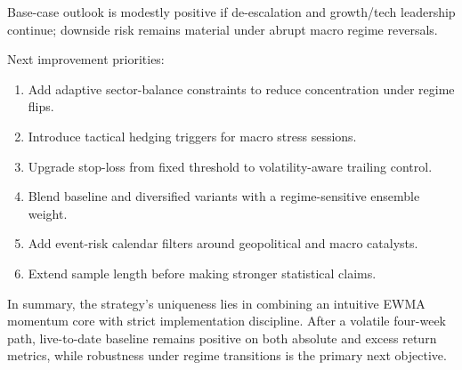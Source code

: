 \documentclass[11pt]{article}
\begin{document}
Base-case outlook is modestly positive if de-escalation and growth/tech leadership continue; downside risk remains material under abrupt macro regime reversals.

Next improvement priorities:
\begin{enumerate}
\item Add adaptive sector-balance constraints to reduce concentration under regime flips.
\item Introduce tactical hedging triggers for macro stress sessions.
\item Upgrade stop-loss from fixed threshold to volatility-aware trailing control.
\item Blend baseline and diversified variants with a regime-sensitive ensemble weight.
\item Add event-risk calendar filters around geopolitical and macro catalysts.
\item Extend sample length before making stronger statistical claims.
\end{enumerate}

In summary, the strategy's uniqueness lies in combining an intuitive EWMA momentum core with strict implementation discipline. After a volatile four-week path, live-to-date baseline remains positive on both absolute and excess return metrics, while robustness under regime transitions is the primary next objective.
\end{document}
